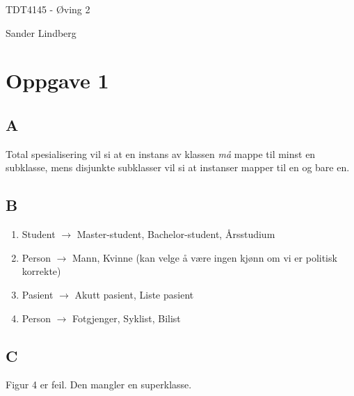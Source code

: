 \documentclass[12pt,a4paper]{article}
\begin{document}
\begin{titlepage}
    \centering
    \vspace*{\fill}

    \vspace*{0.5cm}

    \huge
    TDT4145 - Øving 2

    \vspace*{0.5cm}

    \large Sander Lindberg

    \vspace*{\fill}
    \end{titlepage}

	\newpage
	
	\section{Oppgave 1}
	\subsection{A}
		Total spesialisering vil si at en instans av klassen \textit{må} mappe til minst en subklasse, mens disjunkte subklasser vil si at instanser mapper til en og bare en.
		
	\subsection{B}
		\begin{enumerate}[i]
			\item Student $\rightarrow$ Master-student, Bachelor-student, Årsstudium
			\item Person $\rightarrow$ Mann, Kvinne (kan velge å være ingen kjønn om vi er politisk korrekte)
			\item Pasient $\rightarrow$ Akutt pasient, Liste pasient
			\item Person $\rightarrow$ Fotgjenger, Syklist, Bilist
		\end{enumerate}
		
	\subsection{C}
		Figur 4 er feil. Den mangler en superklasse. 
		
\end{document}
